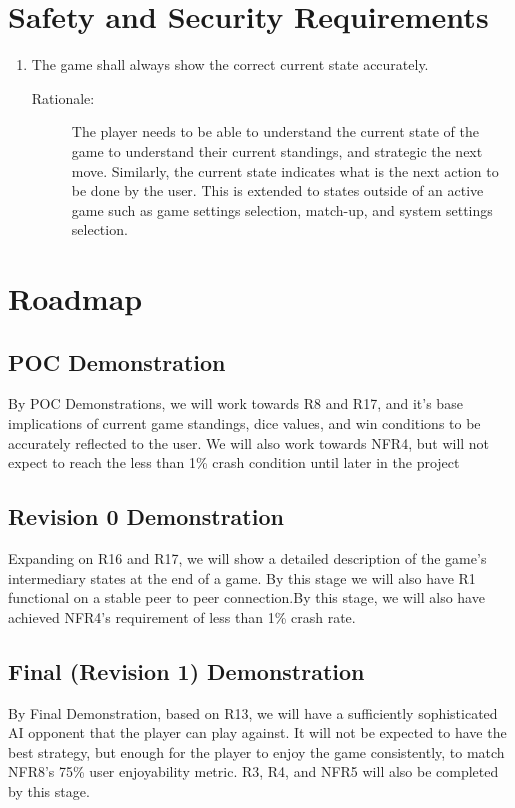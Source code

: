 \documentclass{article}
\begin{document}
\clearpage

\newpage{}
\section{Safety and Security Requirements}

\begin{enumerate}[label=R\arabic*, start=17, left=0pt]

    \item The game shall always show the correct current state accurately.
    \begin{description}
        \item[Rationale:] The player needs to be able to understand the current state of the game to understand their current standings, and strategic the next move. Similarly, the current state indicates what is the next action to be done by the user. This is extended to states outside of an active game such as game settings selection, match-up, and system settings selection.
    \end{description}

\end{enumerate}

\section{Roadmap}

\subsection{POC Demonstration}
	By POC Demonstrations, we will work towards R8 and R17, and it's base implications of current game standings, dice values, and win conditions to be accurately reflected to the user. We will also work towards NFR4, but will not expect to reach the less than 1\% crash condition until later in the project
    
    
\subsection{Revision 0 Demonstration}
	Expanding on R16 and R17, we will show a detailed description of the game's intermediary states at the end of a game. By this stage we will also have R1 functional on a stable peer to peer connection.By this stage, we will also have achieved NFR4's requirement of less than 1\% crash rate.
    
\subsection{Final (Revision 1) Demonstration}
	By Final Demonstration, based on R13, we will have a sufficiently sophisticated AI opponent that the player can play against. It will not be expected to have the best strategy, but enough for the player to enjoy the game consistently, to match NFR8's 75\% user enjoyability metric. R3, R4, and NFR5 will also be completed by this stage.
\end{document}
